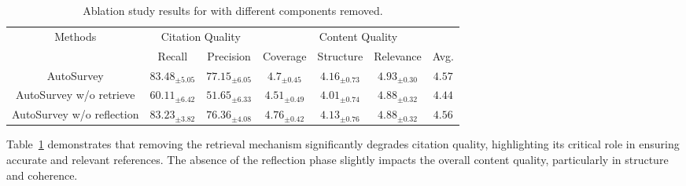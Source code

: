 \begin{table}[th!]
\centering
\caption{Ablation study results for \ourmethod with different components removed.}
\label{table:ablation}
\begin{adjustbox}{width=0.7\textwidth}
\begin{tabular}{ccc|cccc}
\toprule

\multirow{2}{*}{Methods} & \multicolumn{2}{c|}{Citation Quality} & \multicolumn{4}{c}{Content Quality} \\
            &    Recall & Precision & Coverage & Structure & Relevance & Avg. \\ \midrule
 
   AutoSurvey &$83.48_{\pm 5.05}$ & $77.15_{\pm 6.05}$ & $4.7_{\pm 0.45}$      & $4.16_{\pm 0.73}$      & $4.93_{\pm 0.30}$     
   & $4.57$
   \\
                        AutoSurvey w/o retrieve    &$60.11_{\pm 6.42}$ & $51.65_{\pm 6.33}$    & $4.51_{\pm 0.49}$     & $4.01_{\pm 0.74}$      & $4.88_{\pm 0.32}$      & $4.44$  
                 \\
                        AutoSurvey w/o reflection     & $83.23_{\pm 3.82}$ & $76.36_{\pm 4.08}$      & $4.76_{\pm 0.42}$     & $4.13_{\pm 0.76}$      & $4.88_{\pm 0.32}$      &  $4.56$

                \\ 
                        
\bottomrule
\end{tabular}
\end{adjustbox}
\end{table}

Table~\ref{table:ablation} demonstrates that removing the retrieval mechanism significantly degrades citation quality, highlighting its critical role in ensuring accurate and relevant references. The absence of the reflection phase slightly impacts the overall content quality, particularly in structure and coherence.

